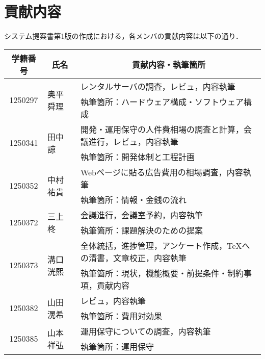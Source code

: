 \chapter{貢献内容}
システム提案書第1版の作成における，各メンバの貢献内容は以下の通り．
\begin{table}[h]
    \centering
    \begin{tabularx}{\textwidth}{cll}
        \multicolumn{1}{c}{学籍番号} & \multicolumn{1}{c}{氏名} & \multicolumn{1}{c}{貢献内容・執筆箇所}         \\
        \hline
        \multirow{2}{*}{1250297} & \multirow{2}{*}{奥平 舜理} & レンタルサーバの調査，レビュ，内容執筆                   \\
                                 &                        & 執筆箇所：ハードウェア構成・ソフトウェア構成                \\
        \hline
        \multirow{2}{*}{1250341} & \multirow{2}{*}{田中 諒}  & 開発・運用保守の人件費相場の調査と計算，会議進行，レビュ，内容執筆     \\
                                 &                        & 執筆箇所：開発体制と工程計画                        \\
        \hline
        \multirow{2}{*}{1250352} & \multirow{2}{*}{中村 祐貴} & Webページに貼る広告費用の相場調査，内容執筆               \\
                                 &                        & 執筆箇所：情報・金銭の流れ                         \\
        \hline
        \multirow{2}{*}{1250372} & \multirow{2}{*}{三上 柊}  & 会議進行，会議室予約，内容執筆                       \\
                                 &                        & 執筆箇所：課題解決のための提案                       \\
        \hline
        \multirow{2}{*}{1250373} & \multirow{2}{*}{溝口 洸熙} & 全体統括，進捗管理，アンケート作成，\TeX への清書，文章校正，内容執筆 \\
                                 &                        & 執筆箇所：現状，機能概要・前提条件・制約事項，貢献内容           \\
        \hline
        \multirow{2}{*}{1250382} & \multirow{2}{*}{山田 滉希} & レビュ，内容執筆                              \\
                                 &                        & 執筆箇所：費用対効果                            \\
        \hline
        \multirow{2}{*}{1250385} & \multirow{2}{*}{山本 祥弘} & 運用保守についての調査，内容執筆                      \\
                                 &                        & 執筆箇所：運用保守                             \\
        \hline
    \end{tabularx}
\end{table}